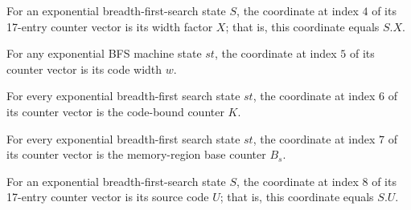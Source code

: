 \begin{lemma}
\label{Complexity.LogProg.ExpBFS.St.toV_X}
\leanok
{}
For an exponential breadth-first-search state $S$, the coordinate at index $4$ of its
17-entry counter vector is its width factor $X$; that is, this coordinate equals $S.X$.
\end{lemma}

\begin{lemma}
\label{Complexity.LogProg.ExpBFS.St.toV_w}
\leanok
{}
For any exponential BFS machine state $st$, the coordinate at index $5$ of its counter
vector is its code width $w$.
\end{lemma}

\begin{lemma}
\label{Complexity.LogProg.ExpBFS.St.toV_K}
\leanok
{}
For every exponential breadth-first search state $st$, the coordinate at index $6$ of
its counter vector is the code-bound counter $K$.
\end{lemma}

\begin{lemma}
\label{Complexity.LogProg.ExpBFS.St.toV_Bs}
\leanok
{}
For every exponential breadth-first search state $st$, the coordinate at index $7$ of
its counter vector is the memory-region base counter $B_s$.
\end{lemma}

\begin{lemma}
\label{Complexity.LogProg.ExpBFS.St.toV_U}
\leanok
{}
For an exponential breadth-first-search state $S$, the coordinate at index $8$ of its
17-entry counter vector is its source code $U$; that is, this coordinate equals $S.U$.
\end{lemma}

